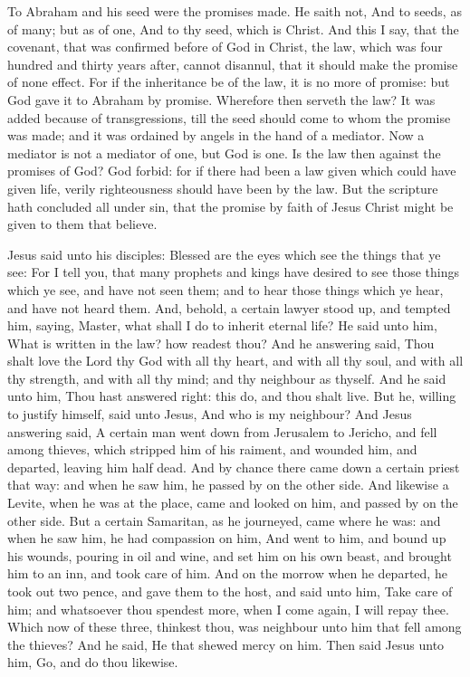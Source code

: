  To Abraham and his seed were the promises made. He saith not, And to seeds, as of many; but as of one, And to thy seed, which is Christ. And this I say, that the covenant, that was confirmed before of God in Christ, the law, which was four hundred and thirty years after, cannot disannul, that it should make the promise of none effect. For if the inheritance be of the law, it is no more of promise: but God gave it to Abraham by promise. Wherefore then serveth the law? It was added because of transgressions, till the seed should come to whom the promise was made; and it was ordained by angels in the hand of a mediator. Now a mediator is not a mediator of one, but God is one. Is the law then against the promises of God? God forbid: for if there had been a law given which could have given life, verily righteousness should have been by the law. But the scripture hath concluded all under sin, that the promise by faith of Jesus Christ might be given to them that believe.


 Jesus said unto his disciples: Blessed are the eyes which see the things that ye see: For I tell you, that many prophets and kings have desired to see those things which ye see, and have not seen them; and to hear those things which ye hear, and have not heard them. And, behold, a certain lawyer stood up, and tempted him, saying, Master, what shall I do to inherit eternal life? He said unto him, What is written in the law? how readest thou? And he answering said, Thou shalt love the Lord thy God with all thy heart, and with all thy soul, and with all thy strength, and with all thy mind; and thy neighbour as thyself. And he said unto him, Thou hast answered right: this do, and thou shalt live. But he, willing to justify himself, said unto Jesus, And who is my neighbour? And Jesus answering said, A certain man went down from Jerusalem to Jericho, and fell among thieves, which stripped him of his raiment, and wounded him, and departed, leaving him half dead. And by chance there came down a certain priest that way: and when he saw him, he passed by on the other side. And likewise a Levite, when he was at the place, came and looked on him, and passed by on the other side. But a certain Samaritan, as he journeyed, came where he was: and when he saw him, he had compassion on him, And went to him, and bound up his wounds, pouring in oil and wine, and set him on his own beast, and brought him to an inn, and took care of him. And on the morrow when he departed, he took out two pence, and gave them to the host, and said unto him, Take care of him; and whatsoever thou spendest more, when I come again, I will repay thee. Which now of these three, thinkest thou, was neighbour unto him that fell among the thieves? And he said, He that shewed mercy on him. Then said Jesus unto him, Go, and do thou likewise.

